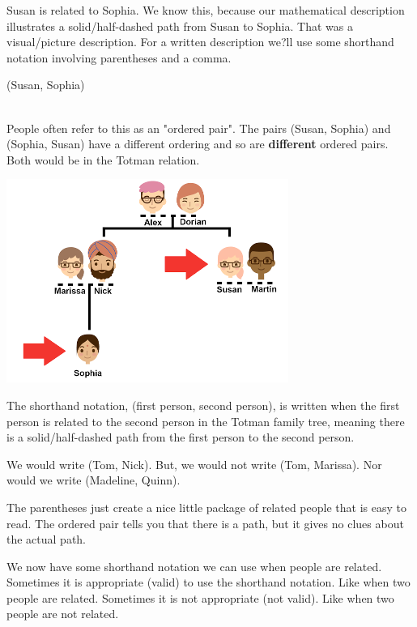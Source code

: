 \documentclass{ximera}
\begin{document}
Susan is related to Sophia. We know this, because our mathematical description illustrates a solid/half-dashed path from Susan to Sophia. That was a visual/picture description. For a written description we?ll use some shorthand notation involving parentheses and a comma.

\begin{notation}
\begin{center}
(Susan, Sophia) 
\end{center}
\end{notation}
\quad \\


People often refer to this as an "ordered pair".  The pairs (Susan, Sophia) and (Sophia, Susan) have a different ordering and so are \textbf{different} ordered pairs. Both would be in the Totman relation.


\begin{center}
\includegraphics{pics/Sophia_Susan.png}
\end{center}

 
The shorthand notation, (first person, second person), is written when the first person is related to the second person in the Totman family tree, meaning there is a solid/half-dashed path from the first person to the second person.

We would write (Tom, Nick). But, we would not write (Tom, Marissa).  Nor would we write (Madeline, Quinn).  

The parentheses just create a nice little package of related people that is easy to read. The ordered pair tells you that there is a path, but it gives no clues about the actual path.

We now have some shorthand notation we can use when people are related. Sometimes it is appropriate (valid) to use the shorthand notation.  Like when two people are related.  Sometimes it is not appropriate (not valid).  Like when two people are not related.
\end{document}
